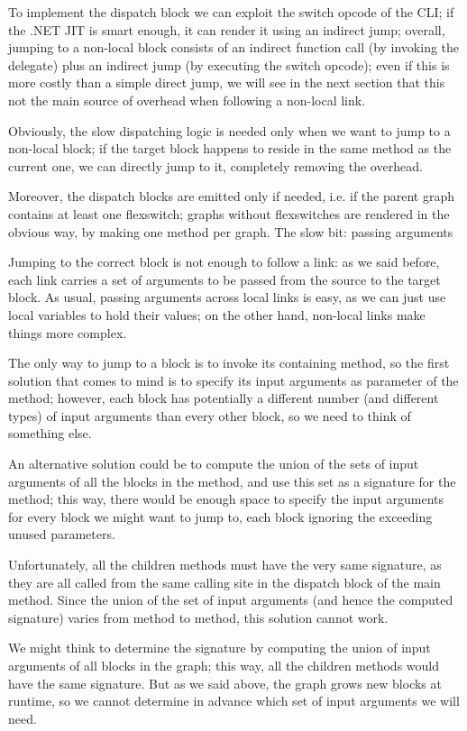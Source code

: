 {To implement the dispatch block we can exploit the switch opcode of the CLI; if the .NET JIT is smart enough, it can render it using an indirect jump; overall, jumping to a non-local block consists of an indirect function call (by invoking the delegate) plus an indirect jump (by executing the switch opcode); even if this is more costly than a simple direct jump, we will see in the next section that this not the main source of overhead when following a non-local link.

Obviously, the slow dispatching logic is needed only when we want to jump to a non-local block; if the target block happens to reside in the same method as the current one, we can directly jump to it, completely removing the overhead.

Moreover, the dispatch blocks are emitted only if needed, i.e. if the parent graph contains at least one flexswitch; graphs without flexswitches are rendered in the obvious way, by making one method per graph.
The slow bit: passing arguments

Jumping to the correct block is not enough to follow a link: as we said before, each link carries a set of arguments to be passed from the source to the target block. As usual, passing arguments across local links is easy, as we can just use local variables to hold their values; on the other hand, non-local links make things more complex.

The only way to jump to a block is to invoke its containing method, so the first solution that comes to mind is to specify its input arguments as parameter of the method; however, each block has potentially a different number (and different types) of input arguments than every other block, so we need to think of something else.

An alternative solution could be to compute the union of the sets of input arguments of all the blocks in the method, and use this set as a signature for the method; this way, there would be enough space to specify the input arguments for every block we might want to jump to, each block ignoring the exceeding unused parameters.

Unfortunately, all the children methods must have the very same signature, as they are all called from the same calling site in the dispatch block of the main method. Since the union of the set of input arguments (and hence the computed signature) varies from method to method, this solution cannot work.

We might think to determine the signature by computing the union of input arguments of all blocks in the graph; this way, all the children methods would have the same signature. But as we said above, the graph grows new blocks at runtime, so we cannot determine in advance which set of input arguments we will need.

}
